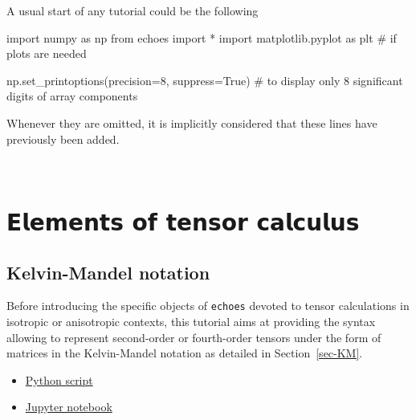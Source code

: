 \documentclass[
  letterpaper,
  DIV=11,
  numbers=noendperiod]{scrreprt}
\newenvironment{Shaded}{\begin{snugshade}}{\end{snugshade}}
\newcommand{\CommentTok}[1]{\textcolor[rgb]{0.37,0.37,0.37}{#1}}
\newcommand{\DecValTok}[1]{\textcolor[rgb]{0.68,0.00,0.00}{#1}}
\newcommand{\ImportTok}[1]{\textcolor[rgb]{0.00,0.46,0.62}{#1}}
\newcommand{\NormalTok}[1]{\textcolor[rgb]{0.00,0.23,0.31}{#1}}
\newcommand{\OperatorTok}[1]{\textcolor[rgb]{0.37,0.37,0.37}{#1}}
\newcommand{\VariableTok}[1]{\textcolor[rgb]{0.07,0.07,0.07}{#1}}
\begin{document}
A usual start of any tutorial could be the following

\begin{Shaded}
\begin{Highlighting}[]
\ImportTok{import}\NormalTok{ numpy }\ImportTok{as}\NormalTok{ np}
\ImportTok{from}\NormalTok{ echoes }\ImportTok{import} \OperatorTok{*}
\ImportTok{import}\NormalTok{ matplotlib.pyplot }\ImportTok{as}\NormalTok{ plt }\CommentTok{\# if plots are needed}

\NormalTok{np.set\_printoptions(precision}\OperatorTok{=}\DecValTok{8}\NormalTok{, suppress}\OperatorTok{=}\VariableTok{True}\NormalTok{)}
\CommentTok{\# to display only 8 significant digits of array components}
\end{Highlighting}
\end{Shaded}

Whenever they are omitted, it is implicitly considered that these lines
have previously been added.

\(\,\)

\part{𝗘𝗹𝗲𝗺𝗲𝗻𝘁𝘀 𝗼𝗳 𝘁𝗲𝗻𝘀𝗼𝗿 𝗰𝗮𝗹𝗰𝘂𝗹𝘂𝘀}

\chapter{Kelvin-Mandel notation}\label{sec-kelvin_mandel}

\begin{tcolorbox}[enhanced jigsaw, left=2mm, bottomrule=.15mm, colbacktitle=quarto-callout-important-color!10!white, colback=white, colframe=quarto-callout-important-color-frame, rightrule=.15mm, bottomtitle=1mm, toptitle=1mm, titlerule=0mm, title={Objectives}, toprule=.15mm, arc=.35mm, opacityback=0, opacitybacktitle=0.6, leftrule=.75mm, breakable, coltitle=black]

Before introducing the specific objects of \texttt{echoes} devoted to
tensor calculations in isotropic or anisotropic contexts, this tutorial
aims at providing the syntax allowing to represent second-order or
fourth-order tensors under the form of matrices in the Kelvin-Mandel
notation as detailed in Section~\ref{sec-KM}.

\end{tcolorbox}

\begin{tcolorbox}[enhanced jigsaw, left=2mm, bottomrule=.15mm, colbacktitle=quarto-callout-note-color!10!white, colback=white, colframe=quarto-callout-note-color-frame, rightrule=.15mm, bottomtitle=1mm, toptitle=1mm, titlerule=0mm, title={Download}, toprule=.15mm, arc=.35mm, opacityback=0, opacitybacktitle=0.6, leftrule=.75mm, breakable, coltitle=black]

\begin{itemize}
\item
  \href{kelvin_mandel.py}{Python script}
\item
  \href{kelvin_mandel.ipynb}{Jupyter notebook}
\end{itemize}

\end{tcolorbox}
\end{document}
